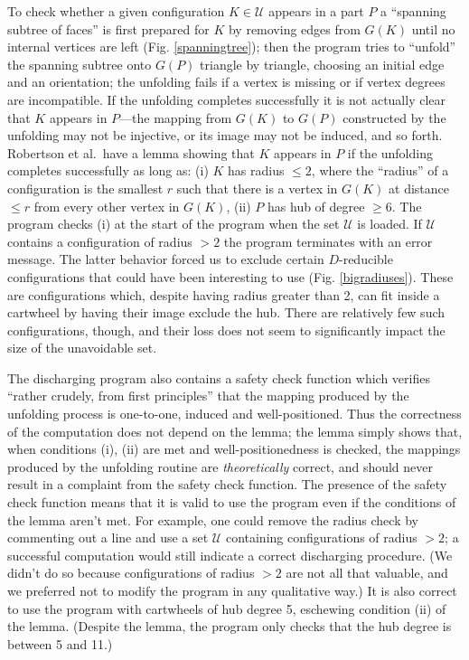\documentclass[11pt]{article}
\newcommand{\mcal}{\mathcal}
\begin{document}
To check whether a given configuration $K \in \mcal{U}$ appears in a part $P$ a ``spanning subtree of faces'' is first prepared for $K$ by removing edges from $G(K)$ until no internal vertices are left (Fig$.$ \ref{spanningtree}); then the program tries to ``unfold'' the spanning subtree onto $G(P)$ triangle by triangle, choosing an initial edge and an orientation; 
the unfolding fails if a vertex is missing or if vertex degrees are incompatible. If the unfolding completes successfully it is not actually clear that $K$ appears in $P$---the mapping from $G(K)$ to $G(P)$ constructed by the unfolding may not be injective, or its image may not be induced, and so forth. 
Robertson et al.~have a lemma showing that $K$ appears in $P$ if the unfolding completes successfully as long as: 
(i) $K$ has radius $\leq 2$, 
where the ``radius'' of a configuration is the smallest $r$ such that there is a vertex in $G(K)$ at distance $\leq r$ from every other vertex in $G(K)$, 
(ii) $P$ has hub of degree $\geq 6$. The program
checks (i) at the start of the program when the set $\mcal{U}$ is loaded. If $\mcal{U}$ contains a configuration of radius $> 2$ the program terminates with an error message.
The latter behavior forced us to exclude 
certain $D$-reducible configurations that could have been interesting to use (Fig$.$ \ref{bigradiuses}). These are configurations which, despite having radius greater than 2, can fit inside a 
cartwheel by having their image exclude the hub. 
There are relatively few such configurations, though, and their loss does not seem to significantly impact the size of the unavoidable set. 

The discharging program also contains a safety check function which verifies ``rather crudely, from first principles'' that the mapping produced by the unfolding process is one-to-one, induced and well-positioned. 
Thus the correctness of the computation does not depend on the lemma; the lemma simply shows that, when conditions (i), (ii) are met and well-positionedness is checked, the mappings produced by the unfolding routine are 
\emph{theoretically} correct, and should never result in a complaint from the safety check function. The presence of the safety check function means that it is valid to use the program even if the conditions of the lemma aren't met. For example, one could remove the radius check by commenting out a line and use a set $\mcal{U}$ containing configurations of radius $> 2$; a successful computation would still indicate a correct discharging procedure. (We didn't do so because configurations of radius $> 2$ are not all that valuable, and we preferred not to modify the program in any qualitative way.) It is also correct to use the program with cartwheels of hub degree 5, eschewing condition (ii) of the lemma. 
(Despite the lemma, the program only checks that the hub degree is between 5 and 11.)
\end{document}

